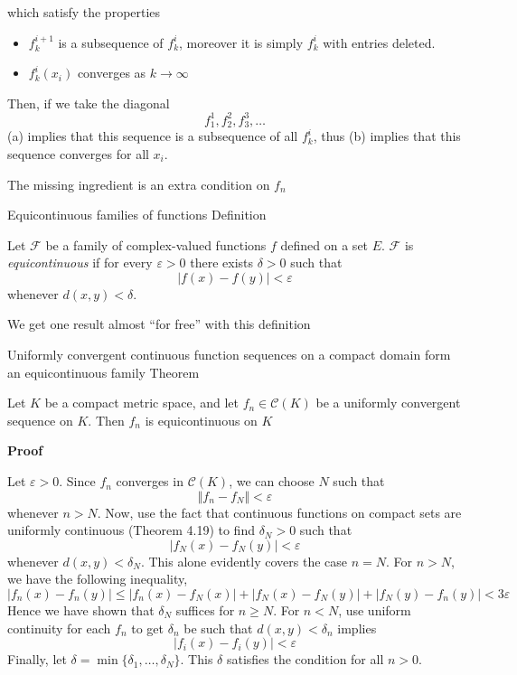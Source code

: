 \begin{result}
    which satisfy the properties
    \begin{itemize}
        \item[(a)] $f^{i+1}_k$ is a subsequence of $f^i_k$, moreover it is simply $f^i_k$ with entries deleted. 
        \item[(b)] $f^i_k(x_i)$ converges as $k \to \infty$
    \end{itemize}

    Then, if we take the diagonal
    \[f^1_1, f^2_2,  f^3_3, \ldots\] 
    (a) implies that this sequence is a subsequence of all $f^i_k$, thus (b) implies that this sequence converges for all $x_i$.
\end{result}

The missing ingredient is an extra condition on $f_n$

\begin{result}
    {Equicontinuous families of functions}
    {Definition}

    Let $\mathscr{F}$ be a family of complex-valued functions $f$ defined on a set $E$. $\mathscr{F}$ is \textit{equicontinuous} if for every $\varepsilon > 0$ there exists $\delta > 0$ such that
    \[|f(x) - f(y)| < \varepsilon\]
    whenever $d(x, y) < \delta$.
\end{result}

We get one result almost ``for free'' with this definition

\begin{result}
    {Uniformly convergent continuous function sequences on a compact domain form an equicontinuous family}
    {Theorem}

    Let $K$ be a compact metric space, and let $f_n \in \mathscr{C}(K)$ be a uniformly convergent sequence on $K$. Then $f_n$ is equicontinuous on $K$

    \textbf{Proof}

    Let $\varepsilon > 0$. Since $f_n$ converges in $\mathscr{C}(K)$, we can choose $N$ such that
    \[\Vert f_n - f_N \Vert < \varepsilon\]
    whenever $n > N$. Now, use the fact that continuous functions on compact sets are uniformly continuous (Theorem 4.19) to find $\delta_N > 0$ such that 
    \[|f_N(x) - f_N(y)| < \varepsilon\]
    whenever $d(x, y) < \delta_N$. This alone evidently covers the case $n = N$. For $n > N$, we have the following inequality,
    \[|f_n(x) - f_n(y)| \leq |f_n(x) - f_N(x)| + |f_N(x) - f_N(y)| + |f_N(y) - f_n(y)| < 3\varepsilon\]
    Hence we have shown that $\delta_N$ suffices for $n \geq N$. For $n < N$, use uniform continuity for each $f_n$ to get $\delta_n$ be such that $d(x, y) < \delta_n$ implies
    \[|f_i(x) - f_i(y)| < \varepsilon\]
    Finally, let $\delta = \min \{\delta_1, \ldots, \delta_N\}$. This $\delta$ satisfies the condition for all $n > 0$.
\end{result}
